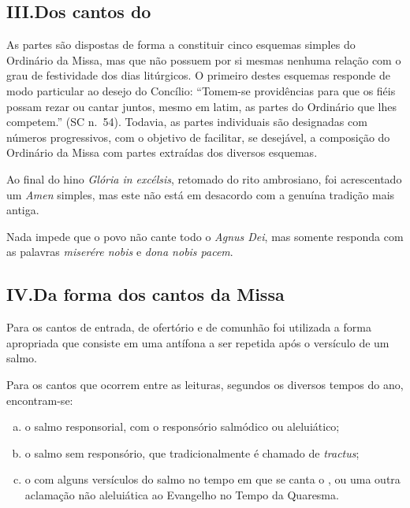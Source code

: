 \subsection{III.\@ Dos cantos do {\KS}}\label{subsection:praenotanda-3}

 As partes são dispostas de forma a constituir cinco esquemas simples do Ordinário da Missa, mas que não possuem por si mesmas nenhuma relação com o grau de festividade dos dias litúrgicos. O primeiro destes esquemas responde de modo particular ao desejo do Concílio: ``Tomem-se providências para que os fiéis possam rezar ou cantar juntos, mesmo em latim, as partes do Ordinário que lhes competem.'' (SC n.\ 54). Todavia, as partes individuais são designadas com números progressivos, com o objetivo de facilitar, se desejável, a composição do Ordinário da Missa com partes extraídas dos diversos esquemas.

 Ao final do hino \textcolor{gregoriocolor}{\emph{Glória in excélsis}}, retomado do rito ambrosiano, foi acrescentado um \textcolor{gregoriocolor}{\emph{Amen}} simples, mas este não está em desacordo com a genuína tradição mais antiga.

 Nada impede que o povo não cante todo o \textcolor{gregoriocolor}{\emph{Agnus Dei}}, mas somente responda com as palavras \textcolor{gregoriocolor}{\emph{miserére nobis}} e \textcolor{gregoriocolor}{\emph{dona nobis pacem}}.

\subsection{IV.\@ Da forma dos cantos da Missa}

 Para os cantos de entrada, de ofertório e de comunhão foi utilizada a forma apropriada que consiste em uma antífona a ser repetida após o versículo de um salmo.

 Para os cantos que ocorrem entre as leituras, segundos os diversos tempos do ano, encontram-se:
\begin{enumerate}[a)]
  \item o salmo responsorial, com o responsório salmódico ou aleluiático;

  \item o salmo sem responsório, que tradicionalmente é chamado de \emph{tractus};

  \item o {\Al} com alguns versículos do salmo no tempo em que se canta o \textcolor{gregoriocolor}{\Al}, ou uma outra aclamação não aleluiática ao Evangelho no Tempo da Quaresma.
\end{enumerate}

